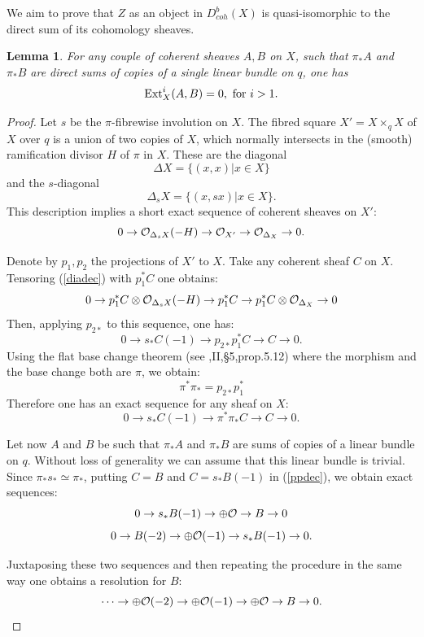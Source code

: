 \documentclass[12pt]{article}
\newtheorem{lemma}[theorem]{Lemma}
\def\db#1{ D^b_{coh}({#1})}
\begin{document}
We aim to prove that $Z$ as an object in $\db{X}$ is quasi-isomorphic to the direct sum of its cohomology sheaves.

\begin{lemma}
For any couple of coherent sheaves $A,B$ on $X$, such that 
$\pi_{*}A$ and $\pi_{*}B$ are direct sums of copies of a single linear bundle on $q$, one has
$$
{\rm Ext}^{i}_{X}(A,B)=0,\  {\rm for}\  i>1.
$$
\end{lemma}
\begin{proof}
Let $s$ be the $\pi $-fibrewise involution on $X$. The fibred square $X'=X\times _qX$ of $X$ over $q$ is a union of two
copies of $X$, which normally intersects in the (smooth) ramification divisor $H$ of $\pi$ in $X$. These are the diagonal 
$$
\Delta X=\{(x,x)|x\in X\}
$$
and the $s$-diagonal
$$
\Delta _sX=\{(x,sx)|x\in X\}.
$$
This description implies a short exact sequence of coherent 
sheaves on $X'$:
\begin{equation}\label{diadec}
0\to {\cal O}_{\Delta _sX}(-H)\to {\cal O}_{X'}\to {\cal O}_{\Delta _X}\to 0.
\end{equation}

Denote by $p_{1}, p_{2}$ the projections of $X'$ to $X$. 
Take any coherent sheaf $C$ on $X$. Tensoring (\ref{diadec})
with $p_{1}^{*}C$ one obtains:
$$
0\to p_{1}^{*}C\otimes {\cal O}_{\Delta _sX}(-H)\to p_{1}^{*}C\to p_{1}^{*}C\otimes {\cal O}_{\Delta _X}\to 0
$$
Then, applying $p_{2*}$ to this sequence, one has:
$$
0\to s_{*}C(-1)\to p_{2*}p_{1}^{*}C\to C\to 0.
$$
Using the flat base change theorem (see \cite{H},II,\S5,prop.5.12) where the morphism and the base change both are $\pi $, we obtain:
$$
\pi ^{*}\pi _{*}=p_{2*}p_{1}^{*}
$$
Therefore one has an exact sequence for any sheaf on $X$:
\begin{equation}\label{ppdec}
0\to s_{*}C(-1)\to \pi ^{*}\pi _{*}C\to C\to 0.
\end{equation}

Let now $A$ and $B$ be such that $\pi_{*}A$ and $\pi_{*}B$
are sums of copies of a linear bundle on $q$. Without loss of generality we can assume that this linear bundle is trivial.
Since $\pi _{*}s_{*}\simeq \pi _{*}$, putting $C=B$ and $C=s_{*}B(-1)$ in (\ref{ppdec}), we obtain exact sequences:
$$
0\to s_{*}B(-1)\to \oplus {\cal O}\to B\to 0
$$
$$
0\to B(-2)\to \oplus {\cal O}(-1)\to s_{*}B(-1)\to 0.
$$

Juxtaposing these two sequences and then repeating the procedure in the same way one obtains a resolution for $B$:
$$
\dots \to \oplus {\cal O}(-2)\to \oplus {\cal O}(-1)\to \oplus {\cal O}\to B\to 0.
$$


\end{proof}
\end{document}
